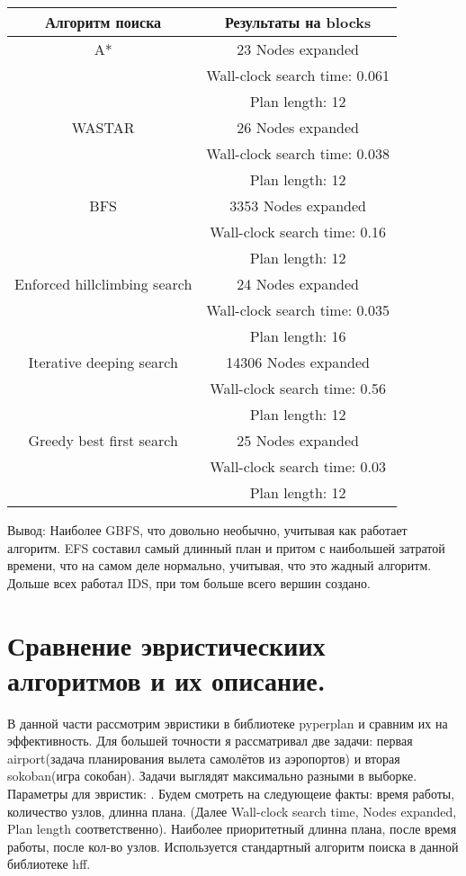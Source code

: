 \documentclass{article}
\begin{document}
\begin{center}
\begin{tabular}{|c|c|}
\hline
Алгоритм поиска&Результаты на blocks\\
\hline
A*&23 Nodes expanded\\
&Wall-clock search time: 0.061\\
&Plan length: 12\\
\hline
WASTAR&26 Nodes expanded\\
&Wall-clock search time: 0.038\\
&Plan length: 12\\
\hline
BFS&3353 Nodes expanded\\
&Wall-clock search time: 0.16\\
&Plan length: 12\\
\hline
Enforced hillclimbing search&24 Nodes expanded\\
&Wall-clock search time: 0.035\\
&Plan length: 16\\
\hline
Iterative deeping search&14306 Nodes expanded\\
&  Wall-clock search time: 0.56\\
&Plan length: 12\\
\hline
Greedy best first search&25 Nodes expanded\\
&Wall-clock search time: 0.03\\
&Plan length: 12\\
\hline
\end{tabular}
\end{center}  

Вывод: \newline
Наиболее GBFS, что довольно необычно, учитывая как работает алгоритм. EFS составил самый длинный план и притом с наибольшей затратой времени, что на самом деле нормально, учитывая, что это жадный алгоритм. Дольше всех работал IDS, при том больше всего вершин создано.

\section*{Сравнение эвристическиих алгоритмов и их описание.}

В данной части рассмотрим эвристики в библиотеке pyperplan и сравним их на эффективность. Для большей точности я рассматривал две задачи: первая airport(задача планирования вылета самолётов из аэропортов) и вторая sokoban(игра сокобан). Задачи выглядят максимально разными в выборке. Параметры для эвристик: \newline.
Будем смотреть на следующеие факты: время работы, количество узлов, длинна плана. (Далее Wall-clock search time, Nodes expanded, Plan length соответственно). Наиболее приоритетный длинна плана, после время работы, после кол-во узлов. Используется стандартный алгоритм поиска в данной библиотеке hff.
\end{document}
